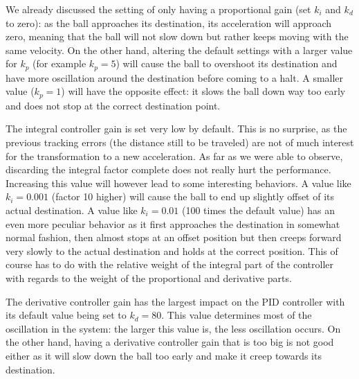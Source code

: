 We already discussed the setting of only having a proportional gain (set $k_i$ and $k_d$ to zero): as the ball approaches its destination, its acceleration will approach zero, meaning that the ball will not slow down but rather keeps moving with the same velocity. On the other hand, altering the default settings with a larger value for $k_p$ (for example $k_p = 5$) will cause the ball to overshoot its destination and have more oscillation around the destination before coming to a halt. A smaller value ($k_p = 1$) will have the opposite effect: it slows the ball down way too early and does not stop at the correct destination point.

The integral controller gain is set very low by default. This is no surprise, as the previous tracking errors (the distance still to be traveled) are not of much interest for the transformation to a new acceleration. As far as we were able to observe, discarding the integral factor complete does not really hurt the performance. Increasing this value will however lead to some interesting behaviors. A value like $k_i = 0.001$ (factor 10 higher) will cause the ball to end up slightly offset of its actual destination. A value like $k_i = 0.01$ (100 times the default value) has an even more peculiar behavior as it first approaches the destination in somewhat normal fashion, then almost stops at an offset position but then creeps forward very slowly to the actual destination and holds at the correct position. This of course has to do with the relative weight of the integral part of the controller with regards to the weight of the proportional and derivative parts.

The derivative controller gain has the largest impact on the PID controller with its default value being set to $k_d = 80$. This value determines most of the oscillation in the system: the larger this value is, the less oscillation occurs. On the other hand, having a derivative controller gain that is too big is not good either as it will slow down the ball too early and make it creep towards its destination.



